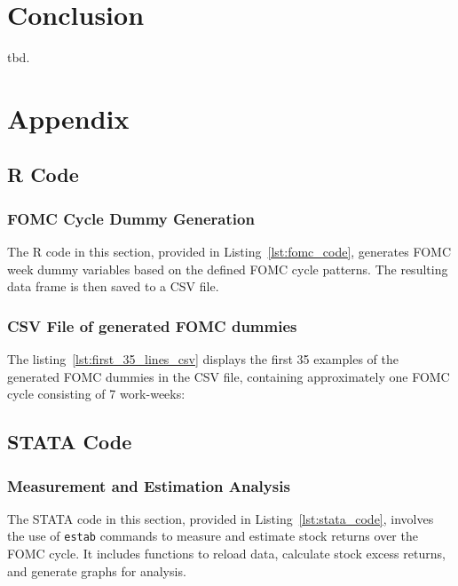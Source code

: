 



%

\chapter{Conclusion}

tbd.

\chapter{Appendix}

\section{R Code}
\subsection{FOMC Cycle Dummy Generation}
\label{app:fomc_code}

The R code in this section, provided in Listing~\ref{lst:fomc_code}, generates FOMC week dummy variables based on the defined FOMC cycle patterns. The resulting data frame is then saved to a CSV file.



\subsection{CSV File of generated FOMC dummies}
\label{app:first_35_lines_csv}

The listing~\ref{lst:first_35_lines_csv} displays the first 35 examples of the generated FOMC dummies in the CSV file,  containing approximately one FOMC cycle consisting of 7 work-weeks:



\section{STATA Code}
\subsection{Measurement and Estimation Analysis}
\label{app:stata_code}

The STATA code in this section, provided in Listing~\ref{lst:stata_code}, involves the use of \texttt{estab} commands to measure and estimate stock returns over the FOMC cycle. It includes functions to reload data, calculate stock excess returns, and generate graphs for analysis.





